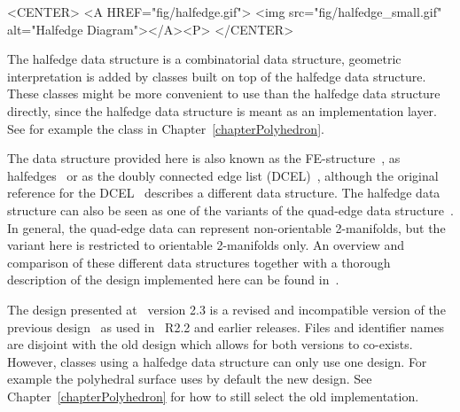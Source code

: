 
\begin{ccHtmlOnly}
    <CENTER>
    <A HREF="fig/halfedge.gif">
        <img src="fig/halfedge_small.gif" alt="Halfedge Diagram"></A><P>
    </CENTER>
\end{ccHtmlOnly}

The halfedge data structure is a combinatorial data structure,
geometric interpretation is added by classes built on top of the
halfedge data structure.  These classes might be more convenient to
use than the halfedge data structure directly, since the halfedge data
structure is meant as an implementation layer.  See for example the
 class in Chapter~\ref{chapterPolyhedron}.

The data structure provided here is also known as the
FE-structure~\cite{w-ebdss-85}, as
halfedges~\cite{m-ism-88,cgal:bfh-mgedm-95} or as the doubly connected edge
list (DCEL)~\cite{bkos-cgaa-97}, although the original reference for
the DCEL~\cite{mp-fitcp-78} describes a different data structure. The
halfedge data structure can also be seen as one of the variants of the
quad-edge data structure~\cite{gs-pmgsc-85}. In general, the quad-edge
data can represent non-orientable 2-manifolds, but the variant here is
restricted to orientable 2-manifolds only. An overview and comparison
of these different data structures together with a thorough
description of the design implemented here can be found
in~\cite{k-ugpdd-99}.  





The design presented at \cgal\ version 2.3 is a revised and incompatible version of the
previous design~\cite{k-ddsps-98} as used in \cgal\ R2.2 and earlier
releases. Files and identifier names are disjoint with the old design
which allows for both versions to co-exists. However, classes using a
halfedge data structure can only use one design. For example the
polyhedral surface  uses by default the new
design. See Chapter~\ref{chapterPolyhedron} for how to still select
the old implementation.

